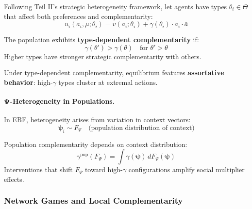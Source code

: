 Following Teil II's strategic heterogeneity framework, let agents have types 
$\theta_i \in \Theta$ that affect both preferences and complementarity:
\begin{equation}
u_i(a_i, \mu; \theta_i) = v(a_i; \theta_i) + \gamma(\theta_i) \cdot a_i \cdot \bar{a}
\end{equation}

\begin{definition}
\label{def:type-comp}
The population exhibits \textbf{type-dependent complementarity} if:
\begin{equation}
\gamma(\theta') > \gamma(\theta) \quad \text{for } \theta' > \theta
\end{equation}
Higher types have stronger strategic complementarity with others.
\end{definition}

\begin{proposition}
\label{prop:sorting}
Under type-dependent complementarity, equilibrium features \textbf{assortative 
behavior}: high-$\gamma$ types cluster at extremal actions.
\end{proposition}

\paragraph{Ψ-Heterogeneity in Populations.}

In EBF, heterogeneity arises from variation in context vectors:
\begin{equation}
\boldsymbol{\psi}_i \sim F_{\Psi} \quad \text{(population distribution of context)}
\end{equation}

\begin{proposition}
\label{prop:context-mediated}
Population complementarity depends on context distribution:
\begin{equation}
\gamma^{\text{pop}}(F_{\Psi}) = \int \gamma(\boldsymbol{\psi}) \, dF_{\Psi}(\boldsymbol{\psi})
\end{equation}
Interventions that shift $F_{\Psi}$ toward high-$\gamma$ configurations amplify 
social multiplier effects.
\end{proposition}

\subsubsection{Network Games and Local Complementarity}


